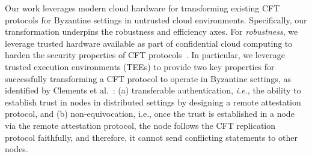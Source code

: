 








Our work leverages modern cloud hardware for transforming existing CFT protocols for Byzantine settings in untrusted cloud environments. Specifically, our transformation underpins the robustness and efficiency axes.
For {\em robustness}, we leverage trusted hardware available as part of confidential cloud computing to harden the security properties of CFT protocols~\cite{intel-sgx, keystone_eurosys, amd-sev, intelTDX}. In particular, we leverage trusted execution environments (TEEs) to provide two key properties for successfully transforming a CFT protocol to operate in Byzantine settings, as identified by Clements et al.~\cite{clement2012}: (a) transferable authentication, {\em i.e.}, the ability to establish trust in nodes in distributed settings by designing a remote attestation protocol, and (b) non-equivocation, i.e., once the trust is established in a node via the remote attestation protocol, the node follows the CFT replication protocol faithfully, and therefore, it cannot send conflicting statements to other nodes. %

